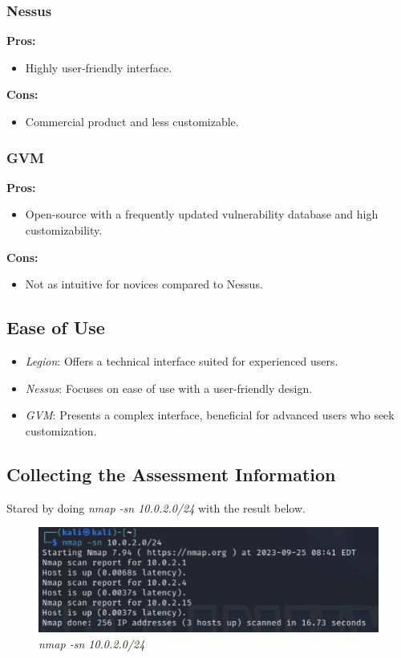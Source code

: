\subsubsection*{Nessus}
\textbf{Pros:}
\begin{itemize}
    \item Highly user-friendly interface.
\end{itemize}
\textbf{Cons:}
\begin{itemize}
    \item Commercial product and less customizable.
\end{itemize}

\subsubsection*{GVM}
\textbf{Pros:}
\begin{itemize}
    \item Open-source with a frequently updated vulnerability database and high customizability.
\end{itemize}
\textbf{Cons:}
\begin{itemize}
    \item Not as intuitive for novices compared to Nessus.
\end{itemize}

\subsection*{Ease of Use}
\begin{itemize}
    \item \textit{Legion}: Offers a technical interface suited for experienced users.
    \item \textit{Nessus}: Focuses on ease of use with a user-friendly design.
    \item \textit{GVM}: Presents a complex interface, beneficial for advanced users who seek customization.
\end{itemize}







\subsection{Collecting the Assessment Information}
Stared by doing \textit{nmap -sn 10.0.2.0/24} with the result below.

\begin{figure}[H]
    \centering
    \includegraphics[width=\linewidth]{pic/nmap sn.png}
    \caption{\textit{nmap -sn 10.0.2.0/24}}
    \label{fig:nmap sn}
\end{figure}

